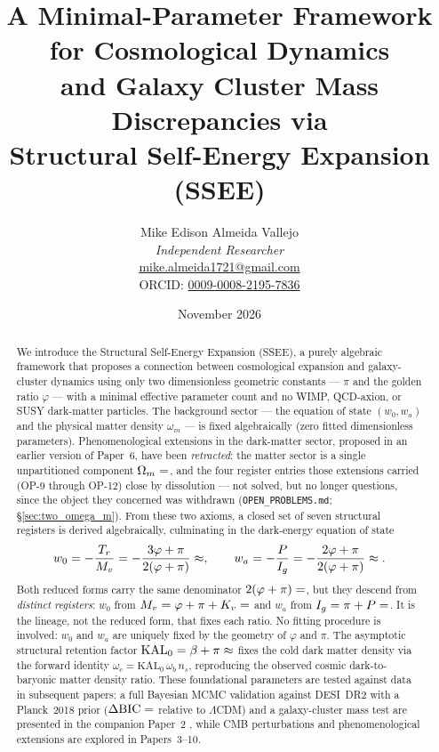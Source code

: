 \documentclass[12pt,a4paper]{article}
\title{\textbf{A Minimal-Parameter Framework for Cosmological Dynamics\\
and Galaxy Cluster Mass Discrepancies via\\
Structural Self-Energy Expansion (SSEE)}}
\author{Mike Edison Almeida Vallejo \\
\small \textit{Independent Researcher} \\
\small \href{mailto:mike.almeida1721@gmail.com}{mike.almeida1721@gmail.com} \\
\small ORCID: \href{https://orcid.org/0009-0008-2195-7836}{0009-0008-2195-7836}
}
\date{November 2026}
\newcommand{\KALz}{\mathrm{KAL}_0}
\begin{document}
\maketitle

\begin{abstract}
We introduce the Structural Self-Energy Expansion (SSEE), a purely algebraic framework that proposes a connection between cosmological expansion and galaxy-cluster dynamics using only two
dimensionless geometric constants — $\pi$ and the golden ratio $\varphi$ — with a
minimal effective parameter count and no WIMP, QCD-axion, or SUSY dark-matter particles.
The background sector --- the equation of state $(w_0,w_a)$ and the physical
matter density $\omega_m$ --- is fixed algebraically (zero fitted dimensionless
parameters). Phenomenological extensions in the
dark-matter sector, proposed in an earlier version of Paper~6, have been
\emph{retracted}: the matter sector is a single unpartitioned component
$\Omega_m=\val{OMEGA_M_TOTAL_d6}$, and the four register entries those extensions carried
(OP-9 through OP-12) close by dissolution --- not solved, but no longer
questions, since the object they concerned was withdrawn
(\texttt{OPEN\_PROBLEMS.md}; \S\ref{sec:two_omega_m}).
From these two axioms, a closed set of seven structural registers is derived algebraically,
culminating in the dark-energy equation of state
\begin{equation*}
  w_0 = -\frac{T_r}{M_v} = -\frac{3\varphi+\pi}{2(\varphi+\pi)} \approx \val{W0_d3},
  \qquad
  w_a = -\frac{P}{I_g} = -\frac{2\varphi+\pi}{2(\varphi+\pi)} \approx \val{WA_d3}.
\end{equation*}
Both reduced forms carry the same denominator $2(\varphi+\pi)=\val{K_V_d6}$, but they descend
from \emph{distinct registers}: $w_0$ from $M_v=\varphi+\pi+K_v=\val{M_V_d6}$ and $w_a$ from
$I_g=\pi+P=\val{K_V_d6}$. It is the lineage, not the reduced form, that fixes each ratio.
No fitting procedure is involved: $w_0$ and $w_a$ are uniquely fixed by the geometry of
$\varphi$ and $\pi$.
The asymptotic structural retention factor $\KALz = \beta + \pi \approx \val{KAL0_d4}$
fixes the cold dark matter density via the forward identity
$\omega_c = \KALz\,\omega_b\,n_s$, reproducing the observed cosmic
dark-to-baryonic matter density ratio.
These foundational parameters are tested against data in subsequent papers: a full Bayesian MCMC validation against DESI~DR2 \citep{AbdulKarim2025}
with a Planck~2018 prior \citep{PlanckVI2020} ($\Delta\mathrm{BIC}=\val{p2_dBIC_lcdm}$ relative to $\Lambda$CDM) and a
galaxy-cluster mass test are presented in the companion Paper~2 \citep{SSEE_paperII}, while CMB perturbations and phenomenological extensions are explored in Papers~3--10.

\end{abstract}
\end{document}
